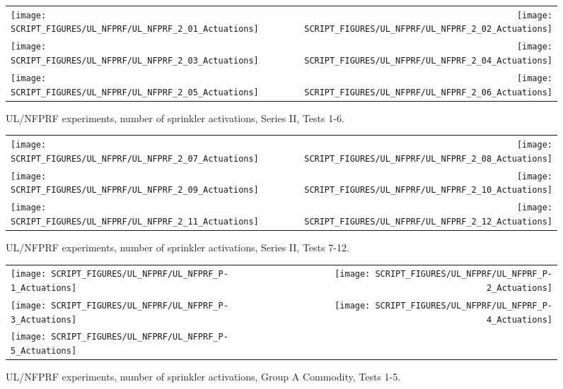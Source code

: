 \begin{figure}[p]
\begin{tabular*}{\textwidth}{l@{\extracolsep{\fill}}r}
\texttt{[image: SCRIPT\_FIGURES/UL\_NFPRF/UL\_NFPRF\_2\_01\_Actuations]} &
\texttt{[image: SCRIPT\_FIGURES/UL\_NFPRF/UL\_NFPRF\_2\_02\_Actuations]} \\
\texttt{[image: SCRIPT\_FIGURES/UL\_NFPRF/UL\_NFPRF\_2\_03\_Actuations]} &
\texttt{[image: SCRIPT\_FIGURES/UL\_NFPRF/UL\_NFPRF\_2\_04\_Actuations]} \\
\texttt{[image: SCRIPT\_FIGURES/UL\_NFPRF/UL\_NFPRF\_2\_05\_Actuations]} &
\texttt{[image: SCRIPT\_FIGURES/UL\_NFPRF/UL\_NFPRF\_2\_06\_Actuations]}
\end{tabular*}
\caption[UL/NFPRF experiments, number of sprinkler activations, Series II, Tests 1-6]{UL/NFPRF experiments, number of sprinkler activations, Series II, Tests 1-6.}
\label{UL_NFPRF_2_1}
\end{figure}

\begin{figure}[p]
\begin{tabular*}{\textwidth}{l@{\extracolsep{\fill}}r}
\texttt{[image: SCRIPT\_FIGURES/UL\_NFPRF/UL\_NFPRF\_2\_07\_Actuations]} &
\texttt{[image: SCRIPT\_FIGURES/UL\_NFPRF/UL\_NFPRF\_2\_08\_Actuations]} \\
\texttt{[image: SCRIPT\_FIGURES/UL\_NFPRF/UL\_NFPRF\_2\_09\_Actuations]} &
\texttt{[image: SCRIPT\_FIGURES/UL\_NFPRF/UL\_NFPRF\_2\_10\_Actuations]} \\
\texttt{[image: SCRIPT\_FIGURES/UL\_NFPRF/UL\_NFPRF\_2\_11\_Actuations]} &
\texttt{[image: SCRIPT\_FIGURES/UL\_NFPRF/UL\_NFPRF\_2\_12\_Actuations]}
\end{tabular*}
\caption[UL/NFPRF experiments, number of sprinkler activations, Series II, Tests 7-12]{UL/NFPRF experiments, number of sprinkler activations, Series II, Tests 7-12.}
\label{UL_NFPRF_2_2}
\end{figure}

\begin{figure}[p]
\begin{tabular*}{\textwidth}{l@{\extracolsep{\fill}}r}
\texttt{[image: SCRIPT\_FIGURES/UL\_NFPRF/UL\_NFPRF\_P-1\_Actuations]} &
\texttt{[image: SCRIPT\_FIGURES/UL\_NFPRF/UL\_NFPRF\_P-2\_Actuations]} \\
\texttt{[image: SCRIPT\_FIGURES/UL\_NFPRF/UL\_NFPRF\_P-3\_Actuations]} &
\texttt{[image: SCRIPT\_FIGURES/UL\_NFPRF/UL\_NFPRF\_P-4\_Actuations]} \\
\texttt{[image: SCRIPT\_FIGURES/UL\_NFPRF/UL\_NFPRF\_P-5\_Actuations]} &
\end{tabular*}
\caption[UL/NFPRF experiments, no.~of sprinkler activations, Group A Commodity, Tests 1-5]{UL/NFPRF experiments, number of sprinkler activations, Group A Commodity, Tests 1-5.}
\label{UL_NFPRF_3_1}
\end{figure}

